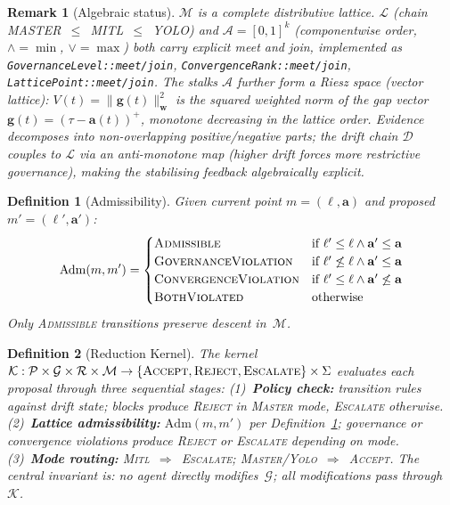 \documentclass[11pt]{article}
\newcommand{\tsc}[1]{\textnormal{\textsc{#1}}}
\newtheorem{definition}{Definition}
\newtheorem{remark}{Remark}
\begin{document}
\begin{remark}[Algebraic status]
\label{rem:algebraic-status}
$\mathcal{M}$ is a \emph{complete distributive lattice}. $\mathcal{L}$ (chain MASTER~$\leq$~MITL~$\leq$~YOLO) and $\mathcal{A} = [0,1]^k$ (componentwise order, $\wedge = \min$, $\vee = \max$) both carry explicit meet and join, implemented as \texttt{GovernanceLevel::meet/join}, \texttt{ConvergenceRank::meet/join}, \texttt{LatticePoint::meet/join}. The stalks $\mathcal{A}$ further form a \emph{Riesz space} (vector lattice): $V(t) = \|\mathbf{g}(t)\|^2_\mathbf{w}$ is the squared weighted norm of the gap vector $\mathbf{g}(t) = (\tau - \mathbf{a}(t))^+$, monotone decreasing in the lattice order. Evidence decomposes into non-overlapping positive/negative parts; the drift chain $\mathcal{D}$ couples to $\mathcal{L}$ via an anti-monotone map (higher drift forces more restrictive governance), making the stabilising feedback algebraically explicit.
\end{remark}

\begin{definition}[Admissibility]
\label{def:admissibility}
Given current point $m = (\ell, \mathbf{a})$ and proposed $m' = (\ell', \mathbf{a}')$:
\[
\mathrm{Adm}(m, m') = \begin{cases}
  \tsc{Admissible}           & \text{if } \ell' \leq \ell \wedge \mathbf{a}' \leq \mathbf{a} \\
  \tsc{GovernanceViolation}  & \text{if } \ell' \not\leq \ell \wedge \mathbf{a}' \leq \mathbf{a} \\
  \tsc{ConvergenceViolation} & \text{if } \ell' \leq \ell \wedge \mathbf{a}' \not\leq \mathbf{a} \\
  \tsc{BothViolated}         & \text{otherwise}
\end{cases}
\]
Only \tsc{Admissible} transitions preserve descent in~$\mathcal{M}$.
\end{definition}

\begin{definition}[Reduction Kernel]
\label{def:kernel}
The kernel $\mathcal{K} : \mathcal{P} \times \mathcal{G} \times \mathcal{R} \times \mathcal{M} \to \{\tsc{Accept}, \tsc{Reject}, \tsc{Escalate}\} \times \Sigma$ evaluates each proposal through three sequential stages:
(1)~\textbf{Policy check:} transition rules against drift state; blocks produce \tsc{Reject} in \tsc{Master} mode, \tsc{Escalate} otherwise.
(2)~\textbf{Lattice admissibility:} $\mathrm{Adm}(m, m')$ per Definition~\ref{def:admissibility}; governance or convergence violations produce \tsc{Reject} or \tsc{Escalate} depending on mode.
(3)~\textbf{Mode routing:} \tsc{Mitl}~$\Rightarrow$~\tsc{Escalate}; \tsc{Master}/\tsc{Yolo}~$\Rightarrow$~\tsc{Accept}.
The central invariant is: \emph{no agent directly modifies~$\mathcal{G}$}; all modifications pass through~$\mathcal{K}$.
\end{definition}
\end{document}
